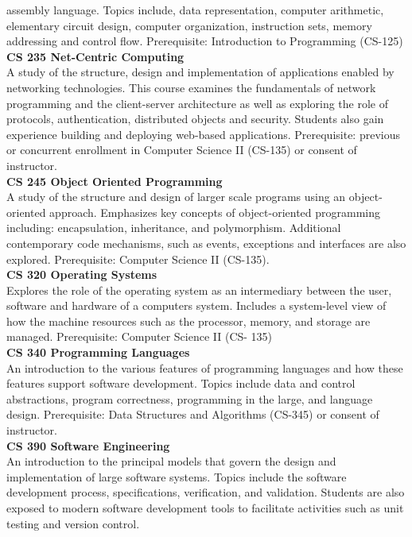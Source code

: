 \documentclass[
  letterpaper,
]{scrbook}
\begin{document}
assembly language. Topics include, data representation, computer
arithmetic, elementary circuit design, computer organization,
instruction sets, memory addressing and control flow. Prerequisite:
Introduction to Programming (CS-125)\\
\textbf{CS 235 Net-Centric Computing}\\
A study of the structure, design and implementation of applications
enabled by networking technologies. This course examines the
fundamentals of network programming and the client-server architecture
as well as exploring the role of protocols, authentication, distributed
objects and security. Students also gain experience building and
deploying web-based applications. Prerequisite: previous or concurrent
enrollment in Computer Science II (CS-135) or consent of instructor.\\
\textbf{CS 245 Object Oriented Programming}\\
A study of the structure and design of larger scale programs using an
object-oriented approach. Emphasizes key concepts of object-oriented
programming including: encapsulation, inheritance, and polymorphism.
Additional contemporary code mechanisms, such as events, exceptions and
interfaces are also explored. Prerequisite: Computer Science II
(CS-135).\\
\textbf{CS 320 Operating Systems}\\
Explores the role of the operating system as an intermediary between the
user, software and hardware of a computers system. Includes a
system-level view of how the machine resources such as the processor,
memory, and storage are managed. Prerequisite: Computer Science II (CS-
135)\\
\textbf{CS 340 Programming Languages}\\
An introduction to the various features of programming languages and how
these features support software development. Topics include data and
control abstractions, program correctness, programming in the large, and
language design. Prerequisite: Data Structures and Algorithms (CS-345)
or consent of instructor.\\
\textbf{CS 390 Software Engineering}\\
An introduction to the principal models that govern the design and
implementation of large software systems. Topics include the software
development process, specifications, verification, and validation.
Students are also exposed to modern software development tools to
facilitate activities such as unit testing and version control.
\end{document}
